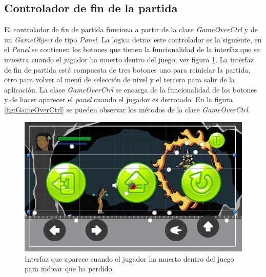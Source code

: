 \subsection{Controlador de fin de la partida}
El controlador de fin de partida funciona a partir de la clase
\textit{GameOverCtrl} y de un \textit{GameObject} de tipo \textit{Panel}. La
logica detras este controlador es la siguiente, en el \textit{Panel} se
contienen los botones que tienen la funcionalidad de la interfaz que se muestra
cuando el jugador ha muerto dentro del juego, ver figura
\ref{fig:GameOverInterfaz}. La interfaz de fin de partida está compuesta de tres
botones uno para reiniciar la partida, otro para volver al menú de selección de
nivel y el tercero para salir de la aplicación. La clase \textit{GameOverCtrl}
se encarga de la funcionalidad de los botones y de hacer aparecer el
\textit{panel} cuando el jugador es derrotado. En la figura
\ref{fig:GameOverCtrl} se pueden observar los métodos de la clase \textit{GameOverCtrl}.

    \begin{figure}[h]
        \centering
        \includegraphics[height=0.2 \textheight]{03TrabajoRealizado/imagenes/GameOverPanel.png}
        \caption{Interfaz que aparece cuando el jugador ha muerto dentro del juego para indicar que ha perdido.}
        \label{fig:GameOverInterfaz}
    \end{figure}
    
